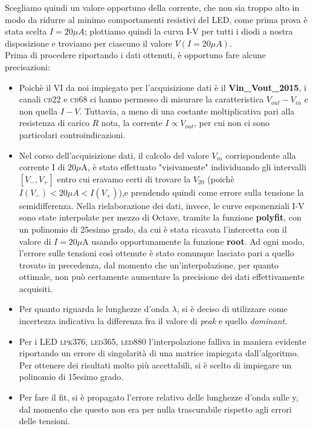 \documentclass[journal, a4paper]{IEEEtran}
\begin{document}
Scegliamo quindi un valore opportuno della corrente, che non sia troppo alto in modo da ridurre al minimo comportamenti resistivi del LED, come prima prova è stata scelta $I = 20 \mu \si{A}$; plottiamo quindi la curva I-V per tutti i diodi a nostra disposizione e troviamo per ciascuno il valore $V(I=20 \mu \si{A})$.\\

Prima di procedere riportando i dati ottenuti, è opportuno fare alcune precisazioni:

\begin{itemize}
\item Poichè il VI da noi impiegato per l'acquisizione dati è il \textbf{Vin\_Vout\_2015}, i canali \textsc{cb22} e \textsc{cb68} ci hanno permesso di misurare la caratteristica $V_{out} - V_{in}$ e non quella $I-V$. Tuttavia, a meno di una costante moltiplicativa pari alla resistenza di carico $R$ nota, la corrente $I \propto V_{out}$, per cui non ci sono particolari controindicazioni.

\item Nel corso dell'acquisizione dati, il calcolo del valore $V_{in}$ corrispondente alla corrente I di $20 \mu $A, è stato effettuato "visivamente" individuando gli intervalli $[V_- , V_+]$ entro cui eravamo certi di trovare la $V_{20}$ (poichè $I(V_-) < 20 \mu \si{A} < I(V_+)$),e prendendo quindi come errore sulla tensione la semidifferenza. Nella rielaborazione dei dati, invece, le curve esponenziali I-V sono state interpolate per mezzo di Octave, tramite la funzione \textbf{polyfit}, con un polinomio di 25esimo grado, da cui è stata ricavata l'intercetta con il valore di $I = 20 \mu $A usando opportunamente la funzione \textbf{root}. Ad ogni modo, l'errore sulle tensioni così ottenute è stato comunque lasciato pari a quello trovato in precedenza, dal momento che un'interpolazione, per quanto ottimale, non può certamente aumentare la precisione dei dati effettivamente acquisiti.

\item Per quanto riguarda le lunghezze d'onda $\lambda$, si è deciso di utilizzare come incertezza indicativa la differenza fra il valore di \textit{peak} e quello \textit{dominant}.

\item Per i LED \textsc{lpk376, led365, led880} l'interpolazione falliva in maniera evidente riportando un errore di singolarità di una matrice impiegata dall'algoritmo. Per ottenere dei risultati molto più accettabili, si è scelto di impiegare un polinomio di 15esimo grado.

\item Per fare il fit, si è propagato l'errore relativo delle lunghezze d'onda sulle y, dal momento che questo non era per nulla trascurabile rispetto agli errori delle tensioni.
\end{itemize}
\end{document}
